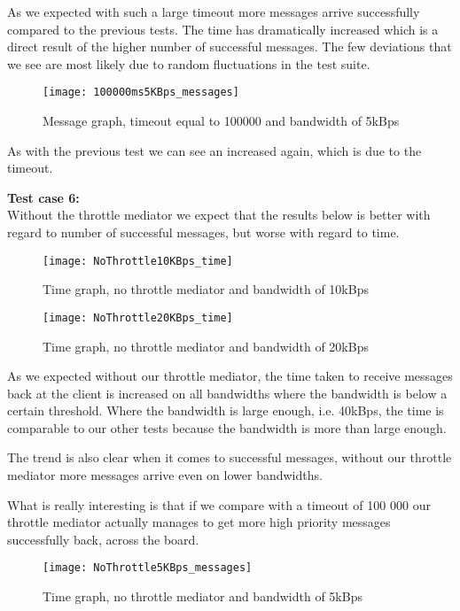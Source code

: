 	As we expected with such a large timeout more messages arrive successfully compared to the previous tests. The time has dramatically increased which is a direct result of the higher number of successful messages. The few deviations that we see are most likely due to random fluctuations in the test suite. 
	
	\begin{figure}[H]
		\centering
		\texttt{[image: 100000ms5KBps\_messages]}
		\caption{Message graph, timeout equal to 100000 and bandwidth of 5kBps} 
		\label{figure:results:100000ms5KBps_messages}
	\end{figure}
	As with the previous test we can see an increased again, which is due to the timeout.
    
    \textbf{Test case 6:}\\
    Without the throttle mediator we expect that the results below is better with regard to number of successful messages, but worse with regard to time.
    \begin{figure}[H]
		\centering
		\texttt{[image: NoThrottle10KBps\_time]}
		\caption{Time graph, no throttle mediator and bandwidth of 10kBps} 
		\label{figure:results:NoThrottle10KBps_time}
	\end{figure}
	
	\begin{figure}[H]
		\centering
		\texttt{[image: NoThrottle20KBps\_time]}
		\caption{Time graph, no throttle mediator and bandwidth of 20kBps} 
		\label{figure:results:NoThrottle20KBps_time}
	\end{figure}
	
	As we expected without our throttle mediator, the time taken to receive messages back at the client is increased on all bandwidths where the bandwidth is below a certain threshold. Where the bandwidth is large enough, i.e. 40kBps, the time is comparable to our other tests because the bandwidth is more than large enough.
	
	
	The trend is also clear when it comes to successful messages, without our throttle mediator more messages arrive even on lower bandwidths.
	
	What is really interesting is that if we compare with a timeout of 100 000 our throttle mediator actually manages to get more high priority messages successfully back, across the board.
	
	\begin{figure}[H]
		\centering
		\texttt{[image: NoThrottle5KBps\_messages]}
		\caption{Time graph, no throttle mediator and bandwidth of 5kBps} 
		\label{figure:results:NoThrottle5KBps_messages}
	\end{figure}

